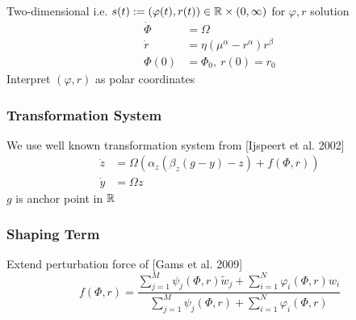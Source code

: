 Two-dimensional i.e. \(s(t) := (\varphi(t), r(t)) \in \mathbb{R} \times (0, \infty)\) for \(\varphi, r\) solution
\begin{align*}
  \dot{\Phi} &= \Omega\\
  \dot{r} &= \eta (\mu^\alpha - r^\alpha)r^\beta\\
  \Phi (0) &= \Phi_0,\ r(0) = r_0
\end{align*}
Interpret \((\varphi, r)\) as polar coordinates

\subsubsection{Transformation System}%
\label{ar:ssub:transformation_system}
We use well known transformation system from [Ijspeert et al. 2002]
\begin{align*}
  \dot{z} &= \Omega (\alpha_z (\beta_z ( g - y ) - z ) + f(\Phi, r))\\
  \dot{y} &= \Omega z
\end{align*}
\(g\) is anchor point in \(\mathbb{R}\)

\subsubsection{Shaping Term}%
\label{ar:ssub:shaping_term}
Extend perturbation force of [Gams et al. 2009]
\[
  f(\Phi, r) = \frac{\sum_{j=1}^M \psi_j(\Phi, r) \tilde{w}_j + \sum_{i=1}^N \varphi_i(\Phi, r)w_i}
  {\sum_{j=1}^M \psi_j(\Phi, r) + \sum_{i=1}^N \varphi_i(\Phi, r)}
\]
